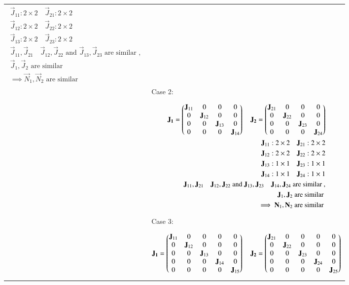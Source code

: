 \begin{longtable}{|p{5cm}|p{13cm}|}
{\begin{align*}
    \vec{J}_{11}: 2\times2 \quad \vec{J}_{21}: 2\times2\\
    \vec{J}_{12}: 2\times2 \quad \vec{J}_{22}: 2\times2\\
    \vec{J}_{13}: 2\times2 \quad \vec{J}_{23}: 2\times2\\
    \vec{J}_{11}, \vec{J}_{21} \quad \vec{J}_{12}, \vec{J}_{22} \text{ and } \vec{J}_{13}, \vec{J}_{23} \text{ are similar }, \\
    \vec{J}_{1}, \vec{J}_{2} \text{ are similar }\\
    \implies \vec{N}_{1}, \vec{N}_{2} \text{ are similar }
\end{align*}}
\\& Case 2: 
\\&
\parbox{12cm}{\begin{align*}
    \mathbf{J_1}=\begin{pmatrix}\mathbf{J}_{11} & 0&0&0 \\ 0&\mathbf{J}_{12}&0&0\\0&0&\mathbf{J}_{13}&0\\0&0&0&\mathbf{J}_{14}\end{pmatrix} \quad \mathbf{J_2}=\begin{pmatrix}\mathbf{J}_{21} & 0&0&0 \\ 0&\mathbf{J}_{22}&0&0\\0&0&\mathbf{J}_{23}&0\\0&0&0&\mathbf{J}_{24}\end{pmatrix}\\
    \mathbf{J}_{11}: 2\times2 \quad \mathbf{J}_{21}: 2\times2\\
    \mathbf{J}_{12}: 2\times2 \quad \mathbf{J}_{22}: 2\times2\\
    \mathbf{J}_{13}: 1\times1 \quad \mathbf{J}_{23}: 1\times1\\
    \mathbf{J}_{14}: 1\times1 \quad \mathbf{J}_{24}: 1\times1\\
    \mathbf{J}_{11}, \mathbf{J}_{21}\quad \mathbf{J}_{12}, \mathbf{J}_{22}  \text{ and } \mathbf{J}_{13}, \mathbf{J}_{23} \quad \mathbf{J}_{14}, \mathbf{J}_{24} \text{ are similar }, \\
    \mathbf{J}_{1}, \mathbf{J}_{2} \text{ are similar }\\
    \implies \mathbf{N}_{1}, \mathbf{N}_{2} \text{ are similar }
\end{align*}}
\\& Case 3: 
\\&
\parbox{12cm}{\begin{align*}
    \vec{J_1}=\myvec{\vec{J}_{11} & 0&0&0&0 \\ 0&\vec{J}_{12}&0&0&0\\0&0&\vec{J}_{13}&0&0\\0&0&0&\vec{J}_{14}&0\\0&0&0&0&\vec{J}_{15}} \quad \vec{J_2}=\myvec{\vec{J}_{21} & 0&0&0&0 \\ 0&\vec{J}_{22}&0&0&0\\0&0&\vec{J}_{23}&0&0\\0&0&0&\vec{J}_{24}&0\\0&0&0&0&\vec{J}_{25}}\\

\end{align*}}
\end{longtable}
